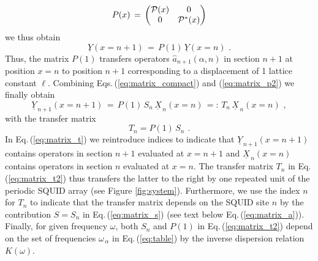 %
\begin{equation} \label{eq:matrix_p2}
P(x) \, = \, 
\begin{pmatrix}
{\cal P}(x) & 0 \\
0 & {\cal P}^*(x) \\
\end{pmatrix}
\end{equation}
%
we thus obtain
%
\begin{equation} \label{eq:matrix_ypy}
\underline{Y}(x=n+1) \, = \, P(1) \, \underline Y(x=n) \, \, .
\end{equation}
%
Thus, the matrix $P(1)$ transfers operators $\hat{a}_{n+1}(\alpha,n)$ in
section $n+1$ at position $x=n$ to position $n+1$ corresponding to a displacement of 
1 lattice constant $\ell$. 
Combining Eqs.\,(\ref{eq:matrix_compact}) and (\ref{eq:matrix_p2}) 
we finally obtain
%
\begin{equation} \label{eq:matrix_t}
\underline{Y}_{\, n+1}(x=n+1) \, = \, P(1) \, S_n \, \underline{X}_{\,n}(x=n) \, =: \, T_n \, \underline{X}_{\,n}(x=n) \, \, ,
\end{equation}
%
with the transfer matrix 
%
\begin{equation} \label{eq:matrix_t2}
T_n = P(1) \, S_n \, \, .
\end{equation}
%
In Eq.\,(\ref{eq:matrix_t}) we reintroduce indices to indicate that $\underline{Y}_{\, n+1}(x=n+1)$ contains operators in section $n+1$ evaluated at $x=n+1$
and $\underline{X}_{\,n}(x=n)$
contains operators in section $n$ evaluated at $x=n$. 
The transfer matrix $T_n$ in Eq.\,(\ref{eq:matrix_t2}) thus transfers the latter 
to the right by one repeated unit of the periodic SQUID array (see Figure \ref{fig:system}).
%
Furthermore, we use the index $n$ for $T_n$ to indicate that the transfer matrix
depends on the SQUID site $n$ by the contribution $S = S_n$ in Eq.\,(\ref{eq:matrix_s}) 
(see text below Eq.\,(\ref{eq:matrix_a})).  
Finally, for given frequency $\omega$, both $S_n$ and $P(1)$ in Eq.\,(\ref{eq:matrix_t2}) 
depend on the set of frequencies $\omega_{\,\alpha}$ in Eq.\,(\ref{eq:table}) by the inverse 
dispersion relation $K(\omega)$. 

